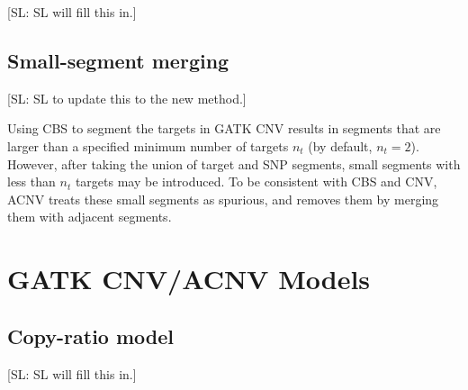 \documentclass[nofootinbib,amssymb,amsmath]{revtex4}
\def\SL#1{{\color [rgb]{0,0,0.8} [SL: #1]}}
\begin{document}
\SL{SL will fill this in.}

\subsection{Small-segment merging} \label{small-segment-merging}

\SL{SL to update this to the new method.}

Using CBS to segment the targets in GATK CNV results in segments that are larger than a specified minimum number of targets $n_t$ (by default, $n_t = 2$).  However, after taking the union of target and SNP segments, small segments with less than $n_t$ targets may be introduced.  To be consistent with CBS and CNV, ACNV treats these small segments as spurious, and removes them by merging them with adjacent segments.

\section{GATK CNV/ACNV Models} \label{models}

\subsection{Copy-ratio model} \label{copy-ratio-model}

\SL{SL will fill this in.}
\end{document}
